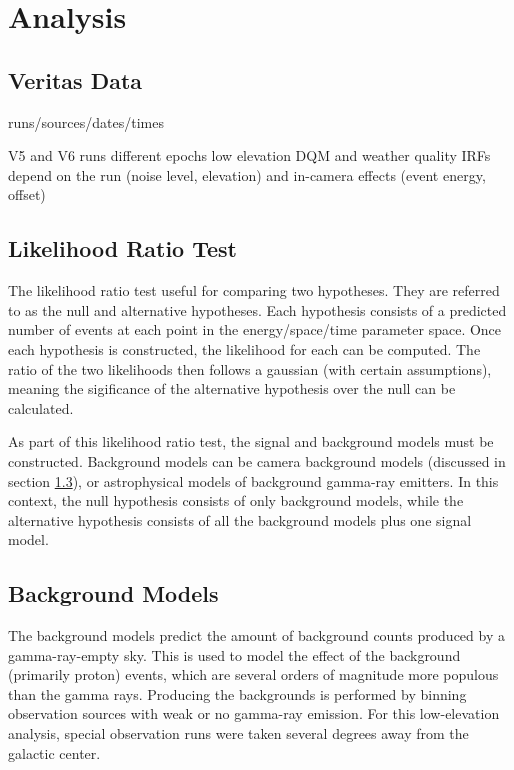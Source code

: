 \cleartooddpage[\thispagestyle{empty}]
\chapter{Analysis}

\section{Veritas Data}
runs/sources/dates/times

V5 and V6 runs
different epochs
low elevation
DQM and weather quality
IRFs depend on the run (noise level, elevation) and in-camera effects (event energy, offset)

\section{Likelihood Ratio Test}
The likelihood ratio test useful for comparing two hypotheses.
They are referred to as the null and alternative hypotheses.
Each hypothesis consists of a predicted number of events at each point in the energy/space/time parameter space.
Once each hypothesis is constructed, the likelihood for each can be computed.
The ratio of the two likelihoods then follows a gaussian (with certain assumptions), meaning the sigificance of the alternative hypothesis over the null can be calculated.

As part of this likelihood ratio test, the signal and background models must be constructed.
Background models can be camera background models (discussed in section \ref{sec:bkgmodels}), or astrophysical models of background gamma-ray emitters.
In this context, the null hypothesis consists of only background models, while the alternative hypothesis consists of all the background models plus one signal model.

\section{Background Models}\label{sec:bkgmodels}

The background models predict the amount of background counts produced by a gamma-ray-empty sky.
This is used to model the effect of the background (primarily proton) events, which are several orders of magnitude more populous than the gamma rays.
Producing the backgrounds is performed by binning observation sources with weak or no gamma-ray emission.
For this low-elevation analysis, special observation runs were taken several degrees away from the galactic center.

